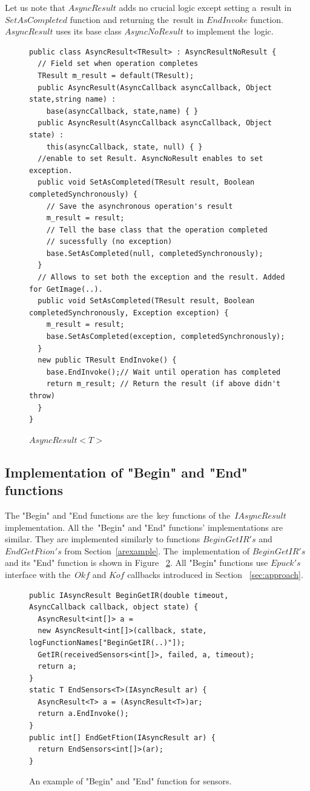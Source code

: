   Let us note that $AsyncResult$ adds no crucial logic except setting 
  a~result in $SetAsCompleted$ function and
  returning the~result in $EndInvoke$ function. 
  $AsyncResult$ uses its base class $AsyncNoResult$ to implement the~logic.
\begin{figure}[!hbp]
\begin{lstlisting}
public class AsyncResult<TResult> : AsyncResultNoResult {
  // Field set when operation completes
  TResult m_result = default(TResult);
  public AsyncResult(AsyncCallback asyncCallback, Object state,string name) : 
    base(asyncCallback, state,name) { }
  public AsyncResult(AsyncCallback asyncCallback, Object state) : 
    this(asyncCallback, state, null) { }
  //enable to set Result. AsyncNoResult enables to set exception.
  public void SetAsCompleted(TResult result, Boolean completedSynchronously) {
    // Save the asynchronous operation's result
    m_result = result;
    // Tell the base class that the operation completed 
    // sucessfully (no exception)
    base.SetAsCompleted(null, completedSynchronously);
  }
  // Allows to set both the exception and the result. Added for GetImage(..).
  public void SetAsCompleted(TResult result, Boolean completedSynchronously, Exception exception) {
    m_result = result;
    base.SetAsCompleted(exception, completedSynchronously);
  }
  new public TResult EndInvoke() {
    base.EndInvoke();// Wait until operation has completed 
    return m_result; // Return the result (if above didn't throw)
  }
}
\end{lstlisting}
\caption{$AsyncResult<T>$} \label{result}
\end{figure}
  \subsection*{Implementation of "Begin" and "End" functions} 
  The "Begin" and "End functions are the~key functions of the~$IAsyncResult$ implementation.
  All the~"Begin" and "End" functions' implementations are similar. 
  They are implemented similarly to functions $BeginGetIR's$
  and $EndGetFtion's$ from Section~\ref{arexample}.
  The~implementation of $BeginGetIR's$ and its "End" function is shown in Figure ~\ref{beginsens}.
  All "Begin" functions use $Epuck's$ interface with the~$Okf$ and $Kof$ callbacks introduced
  in Section ~\ref{sec:approach}.	

\begin{figure}[!hbp]
\begin{lstlisting}
public IAsyncResult BeginGetIR(double timeout, AsyncCallback callback, object state) {
  AsyncResult<int[]> a = 
  new AsyncResult<int[]>(callback, state, logFunctionNames["BeginGetIR(..)"]);
  GetIR(receivedSensors<int[]>, failed, a, timeout);
  return a;
}
static T EndSensors<T>(IAsyncResult ar) {
  AsyncResult<T> a = (AsyncResult<T>)ar;
  return a.EndInvoke();
}
public int[] EndGetFtion(IAsyncResult ar) { 
  return EndSensors<int[]>(ar); 
}
\end{lstlisting}	
\caption{An example of "Begin" and "End" function for sensors.}
\label{beginsens}
\end{figure}

